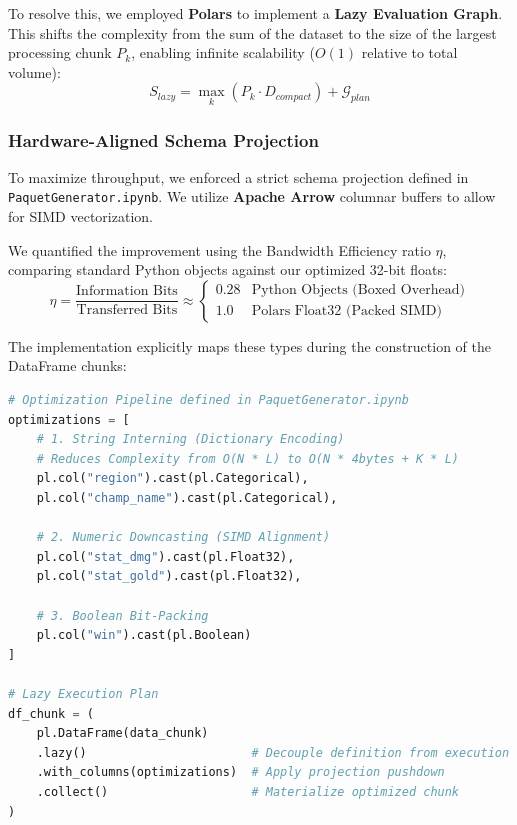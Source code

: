 \documentclass[12pt, a4paper]{article}
\begin{document}
    To resolve this, we employed \textbf{Polars} to implement a \textbf{Lazy Evaluation Graph}. This shifts the complexity from the sum of the dataset to the size of the largest processing chunk $P_k$, enabling infinite scalability ($O(1)$ relative to total volume):
    \begin{equation}
        S_{lazy} = \max_{k} \left( P_k \cdot D_{compact} \right) + \mathcal{G}_{plan}
    \end{equation}

    \subsubsection{Hardware-Aligned Schema Projection}
    To maximize throughput, we enforced a strict schema projection defined in \texttt{PaquetGenerator.ipynb}. We utilize \textbf{Apache Arrow} columnar buffers to allow for SIMD vectorization.

    We quantified the improvement using the Bandwidth Efficiency ratio $\eta$, comparing standard Python objects against our optimized 32-bit floats:
    \begin{equation}
        \eta = \frac{\text{Information Bits}}{\text{Transferred Bits}} \approx \begin{cases}
                                                                                   0.28 & \text{Python Objects (Boxed Overhead)} \\
                                                                                   1.0 & \text{Polars Float32 (Packed SIMD)}
        \end{cases}
    \end{equation}

    The implementation explicitly maps these types during the construction of the DataFrame chunks:

    \begin{lstlisting}[language=Python, caption={High-Density Schema Projection \& String Interning}]
# Optimization Pipeline defined in PaquetGenerator.ipynb
optimizations = [
    # 1. String Interning (Dictionary Encoding)
    # Reduces Complexity from O(N * L) to O(N * 4bytes + K * L)
    pl.col("region").cast(pl.Categorical),
    pl.col("champ_name").cast(pl.Categorical),

    # 2. Numeric Downcasting (SIMD Alignment)
    pl.col("stat_dmg").cast(pl.Float32),
    pl.col("stat_gold").cast(pl.Float32),

    # 3. Boolean Bit-Packing
    pl.col("win").cast(pl.Boolean)
]

# Lazy Execution Plan
df_chunk = (
    pl.DataFrame(data_chunk)
    .lazy()                       # Decouple definition from execution
    .with_columns(optimizations)  # Apply projection pushdown
    .collect()                    # Materialize optimized chunk
)
    \end{lstlisting}
\end{document}
